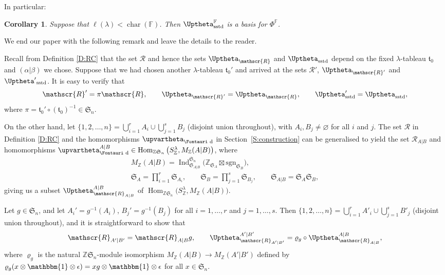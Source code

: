\documentclass[pdftex]{sigma}
\newtheorem{Corollary}[Theorem]{Corollary}
\renewcommand{\t}{\mathfrak{t}}
\newcommand{\sgn}{\mathrm{sgn}}
\newcommand{\Char}{\operatorname{\mathrm{char}}}
\newcommand{\Hom}{\operatorname{Hom}}
\newcommand{\sym}[1]{\mathfrak{S}_{#1}}
\newcommand{\Ind}{\operatorname{\mathrm{Ind}}}
\newcommand{\F}{\mathbb{F}}
\newcommand{\bb}[1]{\mathbbm{{#1}}}
\newcommand{\R}{\mathscr{R}}
\newcommand{\dR}{\text{\Fontauri d}}
\newcommand{\Z}{\mathbb{Z}}
\newcommand{\Jhom}{\upvartheta}
\newcommand{\JHOM}{\Uptheta}
\newcommand{\hJHOM}{{\JHOM}}
\begin{document}
In particular:

\begin{Corollary}
 Suppose that $\ell(\lambda)< \Char(\F)$. Then $\hJHOM_{\mathrm{sstd}}^{\F}$ is a basis for $\Phi^\F$.
\end{Corollary}
	
We end our paper with the following remark and leave the details to the reader.

\begin{Remark} Recall from Definition \ref{D:RC} that the set $\R$ and hence the sets $\JHOM_\R$ and $\JHOM_{\mathrm{sstd}}$ depend on the fixed $\lambda$-tableau $\t_0$ and $(\alpha|\beta)$ we chose. Suppose that we had chosen another $\lambda$-tableau $\t_0'$ and arrived at the sets $\R'$, $\JHOM_{\R'}$ and $\JHOM'{}_{\mathrm{sstd}}$. It is easy to verify that
\begin{gather*}
\R'=\pi\R,\qquad \JHOM_{\R'}=\JHOM_\R,\qquad \JHOM'_{\mathrm{sstd}}= \JHOM_{\mathrm{sstd}},
\end{gather*} where $\pi=\t_0'\circ (\t_0)^{-1} \in \sym{n}$.

On the other hand, let $\{1,2,\dotsc,n\} = \bigcup\limits_{i=1}^r A_i \cup \bigcup\limits_{j=1}^s B_j$ (disjoint union throughout), with $A_i,B_j \ne \varnothing$ for all $i$ and $j$. The set $\R$ in Definition \ref{D:RC} and the homomorphisms $\Jhom_{\dR}$ in Section~\ref{S:construction} can be generalised to yield the set $\R_{A|B}$ and homomorphisms $\Jhom_{\dR}^{A|B} \in\Hom_{\Z\sym{n}}\big(S^\lambda_\Z,M_\Z(A|B)\big)$, where
\begin{gather*}
M_\Z(A|B) = \Ind_{\sym{A|B}}^{\sym{n}} \big(\Z_{\sym{A}} \boxtimes \sgn_{\sym{B}}\big) ,\\
\sym{A} = \prod_{i=1}^r \sym{A_i}, \qquad \sym{B} = \prod_{j=1}^s \sym{B_j}, \qquad \sym{A|B} = \sym{A}\sym{B},
\end{gather*}
giving us a subset $\JHOM^{A|B}_{\R_{A|B}}$ of $\Hom_{\Z\sym{n}}\big(S^\lambda_\Z,M_\Z(A|B)\big)$.

Let $g\in\sym{n}$, and let $A_i'=g^{-1}(A_i)$, $B_j'=g^{-1}(B_j)$ for all $i=1,\ldots,r$ and $j=1,\ldots,s$. Then $\{1,2,\dotsc,n\} = \bigcup\limits_{i=1}^r A'_i \cup \bigcup\limits_{j=1}^s B'_j$ (disjoint union throughout), and it is straightforward to show that
\begin{gather*}
 \R_{A'|B'}=\R_{A|B}g,\qquad \JHOM^{A'|B'}_{\R_{A'|B'}} = \varrho_g \circ \JHOM^{A|B}_{\R_{A|B}},
\end{gather*} where $\varrho_g$ is the natural $\Z\sym{n}$-module isomorphism $M_\Z(A|B) \to M_\Z(A'|B')$ defined by $\varrho_g(x \otimes \bb{1} \otimes \epsilon) = xg \otimes \bb{1} \otimes \epsilon$ for all $x \in \sym{n}$.
\end{Remark}
\end{document}
